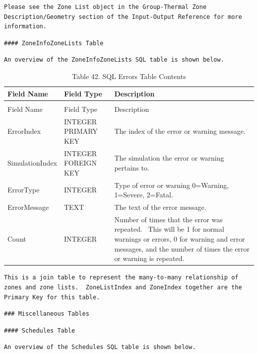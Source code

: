 \begin{lstlisting}
Please see the Zone List object in the Group-Thermal Zone Description/Geometry section of the Input-Output Reference for more information.
\end{lstlisting}

\begin{lstlisting}
#### ZoneInfoZoneLists Table
\end{lstlisting}

\begin{lstlisting}
An overview of the ZoneInfoZoneLists SQL table is shown below.
\end{lstlisting}

\begin{longtable}[c]{p{1.5in}p{1.5in}p{2.99in}}
\caption{Table 42. SQL Errors Table Contents \label{table:table-42.-sql-errors-table-contents}} \tabularnewline
\toprule 
Field Name & Field Type & Description \tabularnewline
\midrule
\endfirsthead

\caption[]{Table 42. SQL Errors Table Contents} \tabularnewline
\toprule 
Field Name & Field Type & Description \tabularnewline
\midrule
\endhead

ErrorIndex & INTEGER PRIMARY KEY & The index of the error or warning message. \tabularnewline
SimulationIndex & INTEGER FOREIGN KEY & The simulation the error or warning pertains to. \tabularnewline
ErrorType & INTEGER & Type of error or warning 0=Warning, 1=Severe, 2=Fatal. \tabularnewline
ErrorMessage & TEXT & The text of the error message. \tabularnewline
Count & INTEGER & Number of times that the error was repeated.~ This will be 1 for normal warnings or errors, 0 for warning and error messages, and the number of times the error or warning is repeated. \tabularnewline
\bottomrule
\end{longtable}

\begin{lstlisting}
This is a join table to represent the many-to-many relationship of zones and zone lists.  ZoneListIndex and ZoneIndex together are the Primary Key for this table.
\end{lstlisting}

\begin{lstlisting}
### Miscellaneous Tables
\end{lstlisting}

\begin{lstlisting}
#### Schedules Table
\end{lstlisting}

\begin{lstlisting}
An overview of the Schedules SQL table is shown below.
\end{lstlisting}


